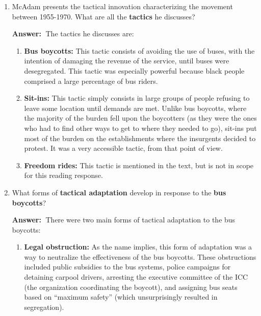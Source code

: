 \documentclass{article}
\newcommand{\answer}{\textbf{Answer:}$\;$}
\begin{document}
\begin{enumerate}[label=\arabic*)]
    \answer
    The relationship is that the introduction and spread of new techniques (i.e. tactical innovation) would often lead to increases in movement activities.
    In fact, peaks in movement activity (measured by the number of movement-initiated actions in Figures 1 and 2), can be clearly related to some new tactic being adopted by the insurgents.
    Similarly, troughs in movement activity usually correspond to successful efforts by the opponents of the movement to counter the new tactics (i.e. tactical adaptation).

    \item McAdam presents the tactical innovation characterizing the movement between 1955-1970. 
    What are all the \textbf{tactics} he discusses?
    
    \answer
    The tactics he discusses are:
    \begin{enumerate}
        \item \textbf{Bus boycotts:} This tactic consists of avoiding the use of buses, with the intention of damaging the revenue of the service, until buses were desegregated.
        This tactic was especially powerful because black people comprised a large percentage of bus riders.
        \item \textbf{Sit-ins:}
        This tactic simply consists in large groups of people refusing to leave some location until demands are met.
        Unlike bus boycotts, where the majority of the burden fell upon the boycotters (as they were the ones who had to find other ways to get to where they needed to go), sit-ins put most of the burden on the establishments where the insurgents decided to protest.
        It was a very accessible tactic, from that point of view.
        \item \textbf{Freedom rides:}
        This tactic is mentioned in the text, but is not in scope for this reading response.
    \end{enumerate}

    \item What forms of \textbf{tactical adaptation} develop in response to the \textbf{bus boycotts}?

    \answer
    There were two main forms of tactical adaptation to the bus boycotts:
    \begin{enumerate}
        \item \textbf{Legal obstruction:}
        As the name implies, this form of adaptation was a way to neutralize the effectiveness of the bus boycotts.
        These obstructions included public subsidies to the bus systems, police campaigns for detaining carpool drivers, arresting the executive committee of the ICC (the organization coordinating the boycott), and assigning bus seats based on ``maximum safety'' (which unsurprisingly resulted in segregation). 
        

\end{enumerate}
\end{enumerate}
\end{document}
